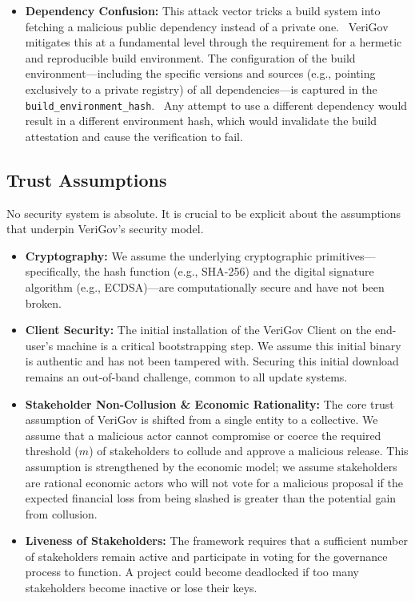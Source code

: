 \documentclass{article}
\begin{document}
\begin{itemize}
\item \textbf{Dependency Confusion:} This attack vector tricks a build system into fetching a malicious public dependency instead of a private one.~\cite{birsan2021dependency} VeriGov mitigates this at a fundamental level through the requirement for a hermetic and reproducible build environment. The configuration of the build environment---including the specific versions and sources (e.g., pointing exclusively to a private registry) of all dependencies---is captured in the \lstinline{build_environment_hash}.~\cite{lamb2022reproducible} Any attempt to use a different dependency would result in a different environment hash, which would invalidate the build attestation and cause the verification to fail.
\end{itemize}

\subsection{Trust Assumptions}

No security system is absolute. It is crucial to be explicit about the assumptions that underpin VeriGov's security model.

\begin{itemize}
\item \textbf{Cryptography:} We assume the underlying cryptographic primitives---specifically, the hash function (e.g., SHA-256) and the digital signature algorithm (e.g., ECDSA)---are computationally secure and have not been broken.
\item \textbf{Client Security:} The initial installation of the VeriGov Client on the end-user's machine is a critical bootstrapping step. We assume this initial binary is authentic and has not been tampered with. Securing this initial download remains an out-of-band challenge, common to all update systems.
\item \textbf{Stakeholder Non-Collusion \& Economic Rationality:} The core trust assumption of VeriGov is shifted from a single entity to a collective. We assume that a malicious actor cannot compromise or coerce the required threshold ($m$) of stakeholders to collude and approve a malicious release. This assumption is strengthened by the economic model; we assume stakeholders are rational economic actors who will not vote for a malicious proposal if the expected financial loss from being slashed is greater than the potential gain from collusion.~\cite{buterin2017casper}
\item \textbf{Liveness of Stakeholders:} The framework requires that a sufficient number of stakeholders remain active and participate in voting for the governance process to function. A project could become deadlocked if too many stakeholders become inactive or lose their keys.
\end{itemize}
\end{document}
